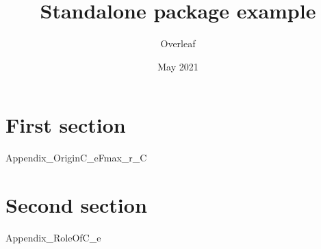 \documentclass{article}
\title{Standalone package example}
\author{Overleaf}
\date{May 2021}
\begin{document}
\maketitle

\section{First section}
{Appendix_OriginC_eFmax_r_C}

\section{Second section}
{Appendix_RoleOfC_e}
\end{document}
